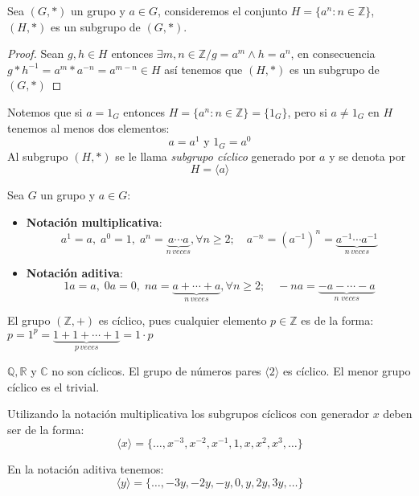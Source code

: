 \begin{fmd-definition} 
	Sea $(G, *)$ un grupo y $a \in G$, consideremos el conjunto $H = \{ a^n: n \in \mathbb{Z}\}$, $(H, *)$ es un subgrupo de $(G, *)$.
	
	\begin{proof}
		Sean $g, h \in H$ entonces $ \exists m, n \in \mathbb{Z} / g = a^m \land h = a^n$, en consecuencia $g*h^{-1} = a^m * a^{-n} = a^{m-n} \in H $
		así tenemos que $(H, *)$ es un subgrupo de $(G,*)$
	\end{proof}
	Notemos que si $a=1_G$ entonces $H=\{a^n:n \in \mathbb{Z}\} = \{1_G\}$, pero si $a\neq 1_G$ en $H$ tenemos al menos dos elementos:
	\[ a = a^1 \mbox{ y } 1_G = a^0 \]
	Al subgrupo $(H, *)$ se le llama \textit{subgrupo cíclico} generado por $a$ y se denota por
	\[ H = \langle a \rangle \]
\end{fmd-definition}
	
	Sea $G$ un grupo y $a \in G$:
	\begin{itemize}
		\item \textbf{Notación multiplicativa}:
		\[ a^1 = a, \; a^0 = 1, \; a^n = \underbrace{a \cdots a}_{n \, veces}, \forall n \ge 2; \quad a^{-n} = (a^{-1})^n = \underbrace{a^{-1} \cdots a^{-1}}_{n \, veces}\] \vspace{-5mm}
		
		\item \textbf{Notación aditiva}:
		\[ 1a = a, \; 0a = 0, \; na = \underbrace{a + \cdots + a}_{n \, veces}, \forall n \ge 2; \quad -na = \underbrace{-a - \cdots -a}_{n \; veces}\]
	\end{itemize}
	
	\begin{fmd-example}
		El grupo $(\mathbb{Z}, +)$ es cíclico, pues cualquier elemento $p \in \mathbb{Z}$ es de la forma: $p = 1^p = \underbrace{1+1+\cdots+1}_{p \, veces} = 1 \cdot p$
	\end{fmd-example}
	
	$\mathbb{Q}, \mathbb{R}$ y $\mathbb{C}$ no son cíclicos. El grupo de números pares $\langle 2 \rangle$ es cíclico. El menor grupo cíclico es el trivial.
	
	Utilizando la notación multiplicativa los subgrupos cíclicos con generador $x$ deben ser de la forma:
	\[ \langle x \rangle = \{ \dots, x^{-3}, x^{-2}, x^{-1}, 1, x, x^2, x^3,  \dots \} \]
	
	En la notación aditiva tenemos:
	\[ \langle y \rangle = \{ \dots, -3y, -2y, -y, 0, y, 2y, 3y,  \dots \} \]


